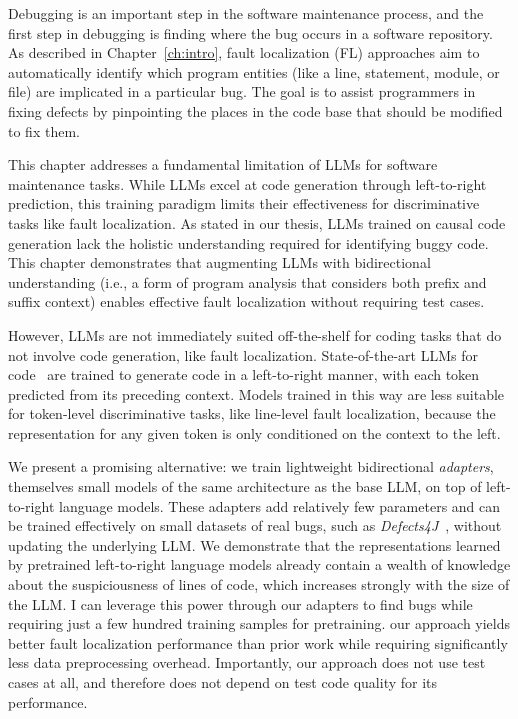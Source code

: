 \documentclass[12pt,openany,oneside,table]{cmuthesis}
\begin{document}
Debugging is an important step in the software maintenance process, and the first step in debugging is finding where the bug occurs in a software repository.
As described in Chapter~\ref{ch:intro}, fault localization (FL) approaches aim to automatically identify which program entities (like a line, statement, module, or file) are implicated in a particular bug. The goal is to assist programmers in fixing defects by pinpointing the places in the code base that should be modified to fix them. 

This chapter addresses a fundamental limitation of LLMs for software maintenance tasks. While LLMs excel at code generation through left-to-right prediction, this training paradigm limits their effectiveness for discriminative tasks like fault localization. As stated in our thesis, LLMs trained on causal code generation lack the holistic understanding required for identifying buggy code. This chapter demonstrates that augmenting LLMs with bidirectional understanding (i.e., a form of program analysis that considers both prefix and suffix context) enables effective fault localization without requiring test cases.

However, LLMs are not immediately suited off-the-shelf for coding tasks that do not involve code generation, like fault localization. State-of-the-art LLMs for code~\cite{chen2021evaluating, black2021gpt, tunstall2022natural, nijkamp2022codegen} are trained to generate code in a left-to-right manner, with each token predicted from its preceding context. 
Models trained in this way are less suitable for token-level discriminative tasks, like line-level fault localization, because the representation for any given token is only conditioned on the context to the left. 

We present a promising alternative: we train lightweight bidirectional \emph{adapters}, themselves small models of the same architecture as the base LLM, on top of left-to-right language models. These adapters add relatively few parameters and can be trained effectively on small datasets of real bugs, such as \textit{Defects4J}~\cite{just2014defects4j}, without updating the underlying LLM. We demonstrate that the representations learned by pretrained left-to-right language models already contain a wealth of knowledge about the suspiciousness of lines of code, which increases strongly with the size of the LLM.  I can leverage this power through our adapters to find bugs while requiring just a few hundred training samples for pretraining. 
our approach yields better fault localization performance than prior work while requiring significantly less data preprocessing overhead. Importantly, our approach does not use test cases at all, and therefore does not depend on test code quality for its performance. 
\end{document}
